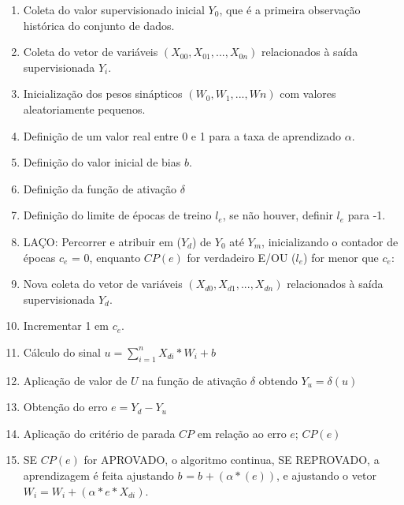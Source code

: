 \documentclass[	12pt, Times, openright, twoside, a4paper, english, brazil]{abntex2}
\begin{document}
            \begin{enumerate}
              \item Coleta do valor supervisionado inicial $Y_{0}$, que é a primeira observação histórica do conjunto de dados.
              \item Coleta do vetor de variáveis $(X_{00}, X_{01}, ..., X_{0n})$ relacionados à saída supervisionada $Y_i$.
              \item Inicialização dos pesos sinápticos $(W_0, W_{1}, ..., W{n})$ com valores aleatoriamente pequenos.
              \item Definição de um valor real entre 0 e 1 para a taxa de aprendizado $\alpha$.
              \item Definição do valor inicial de bias $b$.
              \item Definição da função de ativação $\delta$ 
              \item Definição do limite de épocas de treino $l_e$, se não houver, definir $l_e$ para -1.
              \item LAÇO: Percorrer e atribuir em ($Y_d$) de $Y_0$ até $Y_m$, inicializando o contador de épocas $c_e$ = 0, enquanto $CP(e)$ for verdadeiro E/OU ($l_e$) for menor que $c_e$:
              \item Nova coleta do vetor de variáveis $(X_{d0}, X_{d1}, ..., X_{dn})$ relacionados à saída supervisionada $Y_d$.
              \item Incrementar 1 em $c_e$.
              \item Cálculo do sinal $u = \sum_{i=1}^{n}X_{di}*W_{i}+b$
              \item Aplicação de valor de $U$ na função de ativação $\delta$ obtendo $Y_u = \delta(u)$
              \item Obtenção do erro $e = Y_d-Y_u$
              \item Aplicação do critério de parada $CP$ em relação ao erro $e$; $CP(e)$
              \item SE $CP(e)$ for APROVADO, o algoritmo continua, SE REPROVADO, a aprendizagem é feita ajustando $b_{}=b_{}+(\alpha*(e))$, e ajustando o vetor $W_{i} = W_{i}+(\alpha*e*X_{di})$. 
            \end{enumerate}
 
\end{document}
